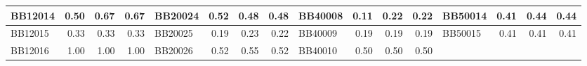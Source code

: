 \begin{table}[!htbp]
\begin{adjustwidth}{-0cm}{}
\begin{tabular}{|l|r|r|r||l|r|r|r||l|r|r|r||l|r|r|r|}
			\hline
			BB12014 & \cellcolor[rgb]{ .384,  .745,  .478}0.50 & \cellcolor[rgb]{ .988,  1,  .992}0.67 & \cellcolor[rgb]{ .988,  1,  .992}0.67 & BB20024 & \cellcolor[rgb]{ .988,  1,  .992}0.52 & \cellcolor[rgb]{ .384,  .745,  .478}0.48 & \cellcolor[rgb]{ .384,  .745,  .478}0.48 & BB40008 & \cellcolor[rgb]{ .384,  .745,  .478}0.11 & \cellcolor[rgb]{ .988,  1,  .992}0.22 & \cellcolor[rgb]{ .988,  1,  .992}0.22 & \multicolumn{1}{l|}{BB50014} & \multicolumn{1}{r|}{\cellcolor[rgb]{ .384,  .745,  .478}0.41} & \multicolumn{1}{r|}{\cellcolor[rgb]{ .988,  1,  .992}0.44} & \multicolumn{1}{r|}{\cellcolor[rgb]{ .988,  1,  .992}0.44} \\
			\hline
			BB12015 & 0.33 & \cellcolor[rgb]{ .988,  1,  .992}0.33 & \cellcolor[rgb]{ .988,  1,  .992}0.33 & BB20025 & \cellcolor[rgb]{ .384,  .745,  .478}0.19 & \cellcolor[rgb]{ .988,  1,  .992}0.23 & \cellcolor[rgb]{ .784,  .914,  .82}0.22 & BB40009 & \cellcolor[rgb]{ .988,  1,  .992}0.19 & \cellcolor[rgb]{ .988,  1,  .992}0.19 & \cellcolor[rgb]{ .988,  1,  .992}0.19 & \multicolumn{1}{l|}{BB50015} & \multicolumn{1}{r|}{\cellcolor[rgb]{ .988,  1,  .992}0.41} & \multicolumn{1}{r|}{\cellcolor[rgb]{ .988,  1,  .992}0.41} & \multicolumn{1}{r|}{\cellcolor[rgb]{ .988,  1,  .992}0.41} \\
			\hline
			BB12016 & \cellcolor[rgb]{ .988,  1,  .992}1.00 & \cellcolor[rgb]{ .988,  1,  .992}1.00 & \cellcolor[rgb]{ .988,  1,  .992}1.00 & BB20026 & \cellcolor[rgb]{ .384,  .745,  .478}0.52 & \cellcolor[rgb]{ .988,  1,  .992}0.55 & \cellcolor[rgb]{ .384,  .745,  .478}0.52 & BB40010 & \cellcolor[rgb]{ .988,  1,  .992}0.50 & \cellcolor[rgb]{ .988,  1,  .992}0.50 & \cellcolor[rgb]{ .988,  1,  .992}0.50 &       &       &       &  \\
			\cline{1-12}    \end{tabular}%
		\label{tab:obtain-single-ml-b}%
	\end{adjustwidth}
\end{table}%


